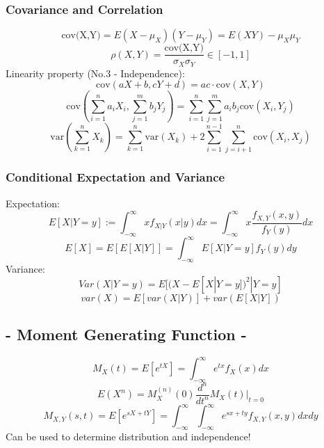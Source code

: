 \documentclass[a4paper,12pt]{article}
\begin{document}
\begin{multicols}{2}
\subsubsection*{Covariance and Correlation}
\[\text{cov(X,Y)} = E(X-\mu_X) (Y-\mu_Y) = E(XY) - \mu_X\mu_Y\]\[
 \rho (X,Y) = \frac{\text{cov(X,Y)}}{\sigma_X\sigma_Y}\in[-1,1]\]
Linearity property (No.3 - Independence):
\[
\text{cov}(aX+b,cY+d) = ac\cdot\text{cov}(X,Y)
\]
\[
\text{cov}(\sum_{i=1}^{n}a_iX_i,\sum_{j=1}^{m}b_jY_j) = \sum_{i=1}^{n}\sum_{j=1}^{m}a_ib_j\text{cov}(X_i,Y_j)
\]
\[
\text{var}(\sum_{k=1}^{n} X_k) = \sum_{k=1}^{n}\text{var}(X_k) + 2\sum_{i=1}^{n-1}\sum_{j=i+1}^{n}\text{cov}(X_i,X_j)
\]

\subsubsection*{Conditional Expectation and Variance}
Expectation:
\[
E[X|Y=y]:=\int_{-\infty}^{\infty}xf_{X|Y}(x|y)dx = \int_{-\infty}^{\infty}x\frac{f_{X,Y}(x,y)}{f_Y(y)}dx
\]
\[
E[X] = E[E[X|Y]] = \int_{-\infty}^{\infty}E[X|Y=y]f_Y(y)dy
\]
Variance:
\[
Var(X|Y=y) = E[(X-E[X|Y=y])^2|Y=y]
\]
\[
var(X) = E[var(X|Y)] + var(E[X|Y])
\]

\subsection*{- Moment Generating Function -}
\[
M_X (t) = E[e^{tX}] = \int_{-\infty}^{\infty} e^{tx}f_X(x)dx
\]
\[
E(X^n) = M_X^{(n)}(0) \frac{d^n}{dt^n}M_X(t)|_{t=0}
\]
\[
M_{X,Y}(s,t) = E[e^{sX+tY}] = \int_{-\infty}^{\infty}\int_{-\infty}^{\infty} e^{sx+ty}f_{X,Y}(x,y)dxdy
\]
\indent Can be used to determine distribution and independence!

\newpage

\end{multicols}
\end{document}
